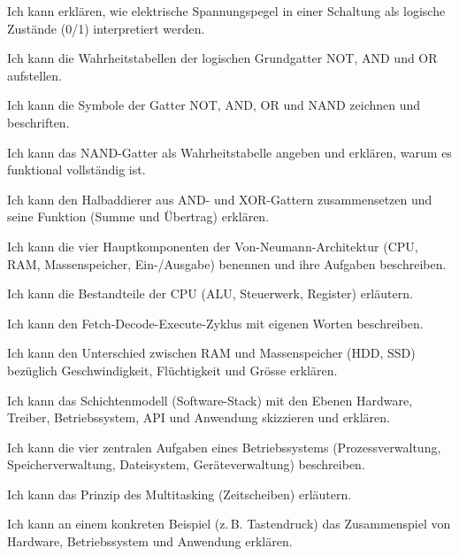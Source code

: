 \begin{todolist}
    \item Ich kann erklären, wie elektrische Spannungspegel in einer Schaltung als logische Zustände (0/1) interpretiert werden.
    \item Ich kann die Wahrheitstabellen der logischen Grundgatter NOT, AND und OR aufstellen.
    \item Ich kann die Symbole der Gatter NOT, AND, OR und NAND zeichnen und beschriften.
    \item Ich kann das NAND-Gatter als Wahrheitstabelle angeben und erklären, warum es funktional vollständig ist.
    \item Ich kann den Halbaddierer aus AND- und XOR-Gattern zusammensetzen und seine Funktion (Summe und Übertrag) erklären.
    \item Ich kann die vier Hauptkomponenten der Von-Neumann-Architektur (CPU, RAM, Massenspeicher, Ein-/Ausgabe) benennen und ihre Aufgaben beschreiben.
    \item Ich kann die Bestandteile der CPU (ALU, Steuerwerk, Register) erläutern.
    \item Ich kann den Fetch-Decode-Execute-Zyklus mit eigenen Worten beschreiben.
    \item Ich kann den Unterschied zwischen RAM und Massenspeicher (HDD, SSD) bezüglich Geschwindigkeit, Flüchtigkeit und Grösse erklären.
    \item Ich kann das Schichtenmodell (Software-Stack) mit den Ebenen Hardware, Treiber, Betriebssystem, API und Anwendung skizzieren und erklären.
    \item Ich kann die vier zentralen Aufgaben eines Betriebssystems (Prozessverwaltung, Speicherverwaltung, Dateisystem, Geräteverwaltung) beschreiben.
    \item Ich kann das Prinzip des Multitasking (Zeitscheiben) erläutern.
    \item Ich kann an einem konkreten Beispiel (z.\,B. Tastendruck) das Zusammenspiel von Hardware, Betriebssystem und Anwendung erklären.
\end{todolist}
